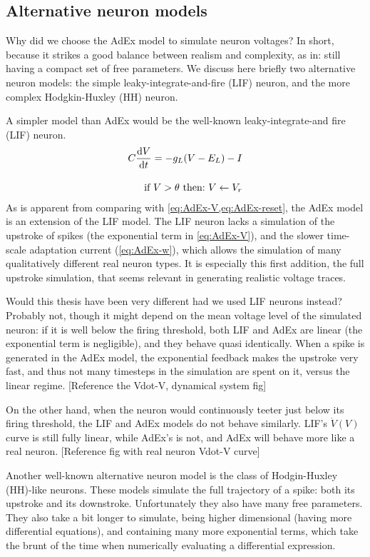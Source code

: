 \subsection{Alternative neuron models}

Why did we choose the AdEx model to simulate neuron voltages? In short, because it strikes a good balance between realism and complexity, as in: still having a compact set of free parameters. We discuss here briefly two alternative neuron models: the simple leaky-integrate-and-fire (LIF) neuron, and the more complex Hodgkin-Huxley (HH) neuron.

A simpler model than AdEx would be the well-known leaky-integrate-and fire (LIF) neuron.
\begin{align*}
    C \frac{\mathrm{d}V}{\mathrm{d}t} =  -g_L (V - E_L) - I \\[1em]
    \text{if}\ V > \theta\ \text{then:}\ V \leftarrow V_r \\
\end{align*}
As is apparent from comparing with \cref{eq:AdEx-V,eq:AdEx-reset}, the AdEx model is an extension of the LIF model. The LIF neuron lacks a simulation of the upstroke of spikes (the exponential term in \cref{eq:AdEx-V}), and the slower time-scale adaptation current (\cref{eq:AdEx-w}), which allows the simulation of many qualitatively different real neuron types.
It is especially this first addition, the full upstroke simulation, that seems relevant in generating realistic voltage traces.

Would this thesis have been very different had we used LIF neurons instead?
Probably not, though it might depend on the mean voltage level of the simulated neuron: if it is well below the firing threshold, both LIF and AdEx are linear (the exponential term is negligible), and they behave quasi identically. When a spike is generated in the AdEx model, the exponential feedback makes the upstroke very fast, and thus not many timesteps in the simulation are spent on it, versus the linear regime.
[Reference the Vdot-V, dynamical system fig]

On the other hand, when the neuron would continuously teeter just below its firing threshold, the LIF and AdEx models do not behave similarly. LIF's $\dot{V}(V)$ curve is still fully linear, while AdEx's is not, and AdEx will behave more like a real neuron. [Reference fig with real neuron Vdot-V curve]

Another well-known alternative neuron model is the class of Hodgin-Huxley (HH)-like neurons. These models simulate the full trajectory of a spike: both its upstroke and its downstroke. Unfortunately they also have many free parameters. They also take a bit longer to simulate, being higher dimensional (having more differential equations), and containing many more exponential terms, which take the brunt of the time when numerically evaluating a differential expression.

